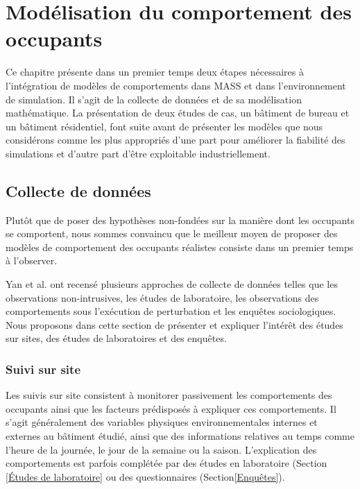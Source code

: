 \chapter{Modélisation du comportement des occupants}
\label{Modélisation du comportement des occupants}

Ce chapitre présente dans un premier temps deux étapes nécessaires à l'intégration de modèles de comportements dans MASS et dans l'environnement de simulation. Il s'agit de la collecte de données et de sa modélisation mathématique. La présentation de deux études de cas, un bâtiment de bureau et un bâtiment résidentiel, font suite avant de présenter les modèles que nous considérons comme les plus appropriés d'une part pour améliorer la fiabilité des simulations et d'autre part d'être exploitable industriellement. 

\section{Collecte de données}

Plutôt que de poser des hypothèses non-fondées sur la manière dont les occupants se comportent, nous sommes convaincu que le meilleur moyen de proposer des modèles de comportement des occupants réalistes consiste dans un premier temps à l'observer.

Yan et al. \cite{Yan-15} ont recensé plusieurs approches de collecte de données telles que les observations non-intrusives, les études de laboratoire, les observations des comportements sous l'exécution de perturbation et les enquêtes sociologiques. Nous proposons dans cette section de présenter et expliquer l'intérêt des études sur sites, des études de laboratoires et des enquêtes.

\subsection{Suivi sur site}

Les suivis sur site consistent à monitorer passivement les comportements des occupants ainsi que les facteurs prédisposés à expliquer ces comportements. Il s'agit généralement des variables physiques environnementales internes et externes au bâtiment étudié, ainsi que des informations relatives au temps comme l'heure de la journée, le jour de la semaine ou la saison. L'explication des comportements est parfois complétée par des études en laboratoire (Section \ref{Études de laboratoire} ou des questionnaires (Section\ref{Enquêtes}).

